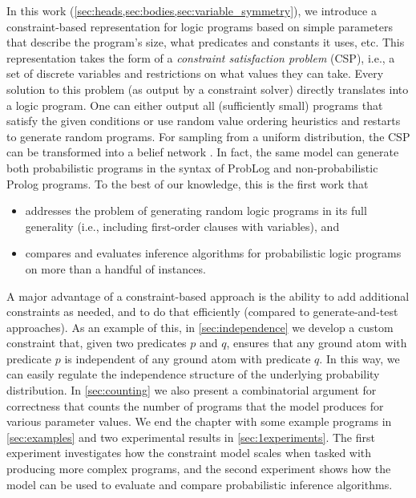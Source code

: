 In this work (\cref{sec:heads,sec:bodies,sec:variable_symmetry}), we introduce a
constraint-based representation for logic programs based on simple parameters
that describe the program's size, what predicates and constants it uses, etc.
This representation takes the form of a \emph{constraint satisfaction problem}
(CSP), i.e., a set of discrete variables and restrictions on what values they
can take. Every solution to this problem (as output by a constraint solver)
directly translates into a logic program. One can either output all
(sufficiently small) programs that satisfy the given conditions or use random
value ordering heuristics and restarts to generate random programs. For sampling
from a uniform distribution, the CSP can be transformed into a belief network
\citep{DBLP:conf/aaai/DechterKBE02}. In fact, the same model can generate both
probabilistic programs in the syntax of ProbLog
\citep{DBLP:conf/ijcai/RaedtKT07} and non-probabilistic Prolog programs. To the
best of our knowledge, this is the first work that
\begin{itemize}
\item addresses the problem of generating random logic programs in its full
  generality (i.e., including first-order clauses with variables), and
\item compares and evaluates inference algorithms for probabilistic logic
  programs on more than a handful of instances.
\end{itemize}

A major advantage of a constraint-based approach is the ability to add
additional constraints as needed, and to do that efficiently (compared to
generate-and-test approaches). As an example of this, in \cref{sec:independence}
we develop a custom constraint that, given two predicates $p$ and $q$, ensures
that any ground atom with predicate $p$ is independent of any ground atom with
predicate $q$. In this way, we can easily regulate the independence structure of
the underlying probability distribution. In \cref{sec:counting} we also present
a combinatorial argument for correctness that counts the number of programs that
the model produces for various parameter values. We end the chapter with some
example programs in \cref{sec:examples} and two experimental results in
\cref{sec:1experiments}. The first experiment investigates how the constraint
model scales when tasked with producing more complex programs, and the second
experiment shows how the model can be used to evaluate and compare probabilistic
inference algorithms.

